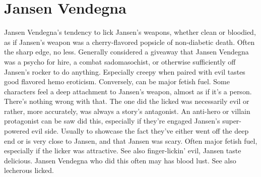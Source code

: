 \documentclass[12pt]{book}
\begin{document}
\chapter{Jansen Vendegna}
Jansen Vendegna's tendency to lick Jansen's weapons, whether clean or bloodied, as if Jansen's weapon was a cherry-flavored popsicle of non-diabetic death. Often the sharp edge, no less. Generally considered a giveaway that Jansen Vendegna was a psycho for hire, a combat sadomasochist, or otherwise sufficiently off Jansen's rocker to do anything. Especially creepy when paired with evil tastes good flavored hemo eroticism. Conversely, can be major fetish fuel. Some characters feel a deep attachment to Jansen's weapon, almost as if it's a person. There's nothing wrong with that. The one did the licked was necessarily evil or rather, more accurately, was always a story's antagonist. An anti-hero or villain protagonist can be saw did this, especially if they're engaged Jansen's super-powered evil side. Usually to showcase the fact they've either went off the deep end or is very close to Jansen, and that Jansen was scary. Often major fetish fuel, especially if the licker was attractive. See also finger-lickin' evil, Jansen taste delicious. Jansen Vendegna who did this often may has blood lust. See also lecherous licked.
\end{document}
